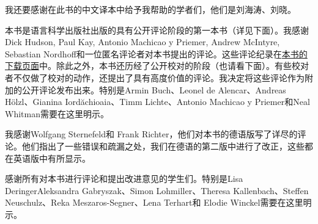 我还要感谢在此书的中文译本中给予我帮助的学者们，他们是刘海涛、刘晓。

本书是语言科学出版社出版的具有公开评论阶段的第一本书（详见下面）。我感谢Dick Hudson, Paul Kay, Antonio Machicao y Priemer, Andrew McIntyre, Sebastian Nordhoff和一位匿名评论者对本书提出的评论。这些评论纪录在\href{\lsURL}{本书的下载页面}中。除此之外，本书还历经了公开校对的阶段（也请看下面）。有些校对者不仅做了校对的动作，还提出了具有高度价值的评论。我决定将这些评论作为附加的公开评论发布出来。特别是Armin Buch、Leonel de Alencar、Andreas Hölzl、Gianina Iordăchioaia、Timm Lichte、Antonio Machicao y Priemer和Neal Whitman需要在这里明示。

我感谢Wolfgang Sternefeld和 Frank Richter，他们对本书的德语版写了详尽的评论。他们指出了一些错误和疏漏之处，我们在德语的第二版中进行了改正，这些都在英语版中有所显示。

感谢所有对本书进行评论和提出改进意见的学生们。特别是Lisa DeringerAleksandra Gabryszak、Simon Lohmiller、Theresa Kallenbach、Steffen Neu\-schulz、Reka Meszaros-Segner、Lena Terhart和
Elodie Winckel需要在这里明示。

